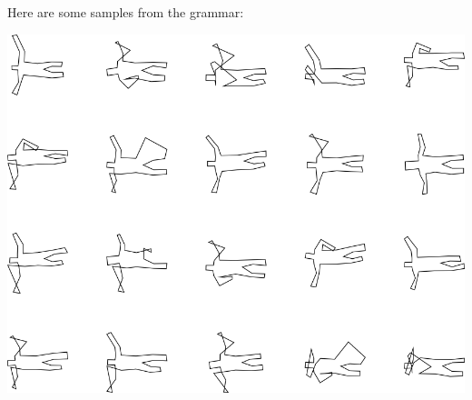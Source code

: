 Here are some samples from the grammar:

\includegraphics[width=6in]{output/3.learning/incremental/gram.23.d/samples.png}

